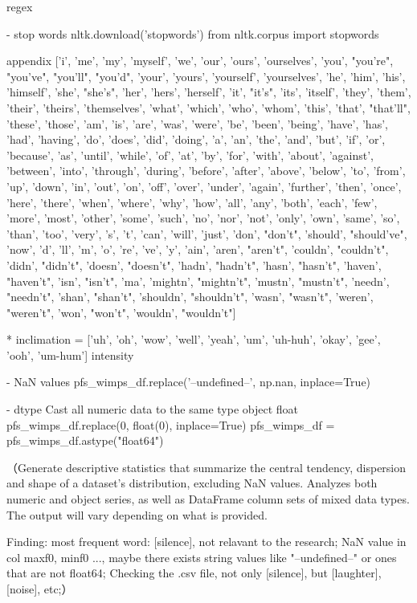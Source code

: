 
regex

- stop words
nltk.download('stopwords')
from nltk.corpus import stopwords

appendix
['i', 'me', 'my', 'myself', 'we', 'our', 'ours', 'ourselves', 'you', "you're", "you've", "you'll", "you'd", 'your', 'yours', 'yourself', 'yourselves', 'he', 'him', 'his', 'himself', 'she', "she's", 'her', 'hers', 'herself', 'it', "it's", 'its', 'itself', 'they', 'them', 'their', 'theirs', 'themselves', 'what', 'which', 'who', 'whom', 'this', 'that', "that'll", 'these', 'those', 'am', 'is', 'are', 'was', 'were', 'be', 'been', 'being', 'have', 'has', 'had', 'having', 'do', 'does', 'did', 'doing', 'a', 'an', 'the', 'and', 'but', 'if', 'or', 'because', 'as', 'until', 'while', 'of', 'at', 'by', 'for', 'with', 'about', 'against', 'between', 'into', 'through', 'during', 'before', 'after', 'above', 'below', 'to', 'from', 'up', 'down', 'in', 'out', 'on', 'off', 'over', 'under', 'again', 'further', 'then', 'once', 'here', 'there', 'when', 'where', 'why', 'how', 'all', 'any', 'both', 'each', 'few', 'more', 'most', 'other', 'some', 'such', 'no', 'nor', 'not', 'only', 'own', 'same', 'so', 'than', 'too', 'very', 's', 't', 'can', 'will', 'just', 'don', "don't", 'should', "should've", 'now', 'd', 'll', 'm', 'o', 're', 've', 'y', 'ain', 'aren', "aren't", 'couldn', "couldn't", 'didn', "didn't", 'doesn', "doesn't", 'hadn', "hadn't", 'hasn', "hasn't", 'haven', "haven't", 'isn', "isn't", 'ma', 'mightn', "mightn't", 'mustn', "mustn't", 'needn', "needn't", 'shan', "shan't", 'shouldn', "shouldn't", 'wasn', "wasn't", 'weren', "weren't", 'won', "won't", 'wouldn', "wouldn't"]

* inclimation = ['uh', 'oh', 'wow', 'well', 'yeah', 'um', 'uh-huh', 'okay', 'gee', 'ooh', 'um-hum']
intensity

- NaN values
pfs_wimps_df.replace('--undefined--', np.nan, inplace=True)

- dtype
Cast all numeric data to the same type
object float
pfs_wimps_df.replace(0, float(0), inplace=True)
pfs_wimps_df = pfs_wimps_df.astype("float64")

（Generate descriptive statistics that summarize the central tendency, dispersion and shape of a dataset's distribution, excluding NaN values.
Analyzes both numeric and object series, as well as DataFrame column sets of mixed data types. The output will vary depending on what is provided.

Finding:
most frequent word: [silence], not relavant to the research;
NaN value in col maxf0, minf0 ..., maybe there exists string values like "--undefined--" or ones that are not float64;
Checking the .csv file, not only [silence], but [laughter], [noise], etc;）





